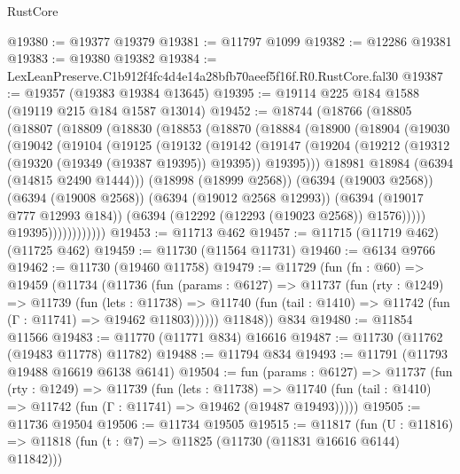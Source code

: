 \begin{lexlean}{RustCore}
\begin{coremodule}
@19380 := @19377 @19379
@19381 := @11797 @1099
@19382 := @12286 @19381
@19383 := @19380 @19382
@19384 := LexLeanPreserve.C1b912f4fc4d4e14a28bfb70aeef5f16f.R0.RustCore.fal30
@19387 := @19357 (@19383 @19384 @13645)
@19395 := @19114 @225 @184 @1588 (@19119 @215 @184 @1587 @13014)
@19452 := @18744
    (@18766
      (@18805
        (@18807
          (@18809
            (@18830
              (@18853
                (@18870
                  (@18884
                    (@18900
                      (@18904
                        (@19030
                          (@19042
                            (@19104
                              (@19125
                                (@19132
                                  (@19142
                                    (@19147
                                      (@19204
                                        (@19212
                                          (@19312 (@19320 (@19349 (@19387 @19395)) @19395))
                                          @19395)))
                                    @18981
                                    @18984
                                    (@6394 (@14815 @2490 @1444)))
                                  (@18998 (@18999 @2568))
                                  (@6394 (@19003 @2568))
                                  (@6394 (@19008 @2568))
                                  (@6394 (@19012 @2568 @12993))
                                  (@6394 (@19017 @777 @12993 @184))
                                  (@6394 (@12292 (@12293 (@19023 @2568)) @1576)))))
                            @19395))))))))))))
@19453 := @11713 @462
@19457 := @11715 (@11719 @462) (@11725 @462)
@19459 := @11730 (@11564 @11731)
@19460 := @6134 @9766
@19462 := @11730 (@19460 @11758)
@19479 := @11729
    (fun (fn : @60) =>
    @19459
      (@11734
        (@11736
          (fun (params : @6127) =>
          @11737
            (fun (rty : @1249) =>
            @11739
              (fun (lets : @11738) =>
              @11740 (fun (tail : @1410) => @11742 (fun (Γ : @11741) => @19462 @11803))))))
        @11848))
    @834
@19480 := @11854 @11566
@19483 := @11770 (@11771 @834) @16616
@19487 := @11730 (@11762 (@19483 @11778) @11782)
@19488 := @11794 @834
@19493 := @11791 (@11793 @19488 @16619 @6138 @6141)
@19504 := fun (params : @6127) =>
  @11737
    (fun (rty : @1249) =>
    @11739
      (fun (lets : @11738) =>
      @11740 (fun (tail : @1410) => @11742 (fun (Γ : @11741) => @19462 (@19487 @19493)))))
@19505 := @11736 @19504
@19506 := @11734 @19505
@19515 := @11817
    (fun (U : @11816) => @11818 (fun (t : @7) => @11825 (@11730 (@11831 @16616 @6144) @11842)))

\end{coremodule}
\end{lexlean}
